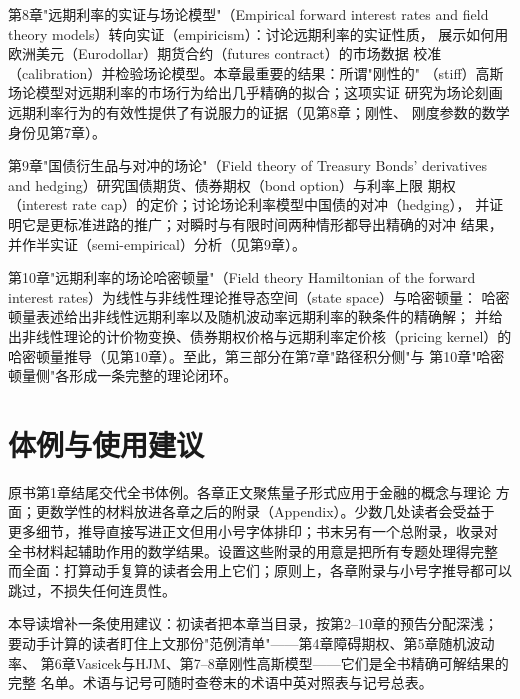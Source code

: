 第8章"远期利率的实证与场论模型"（Empirical forward interest rates and
field theory models）转向实证（empiricism）：讨论远期利率的实证性质，
展示如何用欧洲美元（Eurodollar）期货合约（futures contract）的市场数据
校准（calibration）并检验场论模型。本章最重要的结果：所谓"刚性的"
（stiff）高斯场论模型对远期利率的市场行为给出几乎精确的拟合；这项实证
研究为场论刻画远期利率行为的有效性提供了有说服力的证据（见第8章；刚性、
刚度参数的数学身份见第7章）。

第9章"国债衍生品与对冲的场论"（Field theory of Treasury Bonds'
derivatives and hedging）研究国债期货、债券期权（bond option）与利率上限
期权（interest rate cap）的定价；讨论场论利率模型中国债的对冲（hedging），
并证明它是更标准进路的推广；对瞬时与有限时间两种情形都导出精确的对冲
结果，并作半实证（semi-empirical）分析（见第9章）。

第10章"远期利率的场论哈密顿量"（Field theory Hamiltonian of the forward
interest rates）为线性与非线性理论推导态空间（state space）与哈密顿量：
哈密顿量表述给出非线性远期利率以及随机波动率远期利率的鞅条件的精确解；
并给出非线性理论的计价物变换、债券期权价格与远期利率定价核（pricing
kernel）的哈密顿量推导（见第10章）。至此，第三部分在第7章"路径积分侧"与
第10章"哈密顿量侧"各形成一条完整的理论闭环。

\section{体例与使用建议}

原书第1章结尾交代全书体例。各章正文聚焦量子形式应用于金融的概念与理论
方面；更数学性的材料放进各章之后的附录（Appendix）。少数几处读者会受益于
更多细节，推导直接写进正文但用小号字体排印；书末另有一个总附录，收录对
全书材料起辅助作用的数学结果。设置这些附录的用意是把所有专题处理得完整
而全面：打算动手复算的读者会用上它们；原则上，各章附录与小号字推导都可以
跳过，不损失任何连贯性。

本导读增补一条使用建议：初读者把本章当目录，按第2--10章的预告分配深浅；
要动手计算的读者盯住上文那份"范例清单"——第4章障碍期权、第5章随机波动率、
第6章Vasicek与HJM、第7--8章刚性高斯模型——它们是全书精确可解结果的完整
名单。术语与记号可随时查卷末的术语中英对照表与记号总表。

